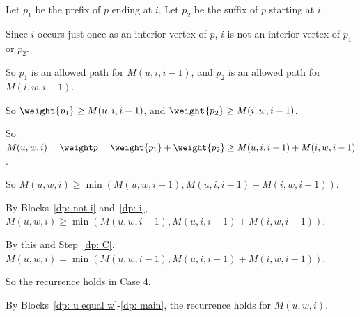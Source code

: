 \begin{longFormProof}
\begin{block}[dp: uwi]
\begin{block}[dp: main]
\begin{block}[dp: i]
        \step Let $p_1$ be the prefix of $p$ ending at $i$.
        Let $p_2$ be the suffix of $p$ starting at $i$.

        \step Since $i$ occurs just once as an interior vertex of $p$,
        $i$ is not an interior vertex of $p_1$ or $p_2$.

        \step So $p_1$ is an allowed path for $M(u, i, i-1)$,
        and $p_2$ is an allowed path for $M(i, w, i-1)$.

        \step So $\weight {p_1} \ge M(u, i, i-1)$,
        and  $\weight {p_2} \ge M(i, w, i-1)$.

        \step So $M(u, w, i) = \weight p = \weight {p_1} + \weight {p_2}
        \ge M(u, i, i-1) + M(i, w, i-1)$.

        \step So  $M(u, w, i) \ge \min( M(u, w, i-1), M(u, i, i-1) + M(i, w, i-1) )$. 
      \end{block}          

      \step By Blocks~\ref{dp: not i} and~\ref{dp: i},
      $M(u, w, i) \ge \min( M(u, w, i-1), M(u, i, i-1) + M(i, w, i-1) )$. 

      \step By this and Step~\ref{dp: C},
      $M(u, w, i) = \min( M(u, w, i-1), M(u, i, i-1) + M(i, w, i-1) )$.

      \step So the recurrence holds in Case 4.
    \end{block}
    \step By Blocks~\ref{dp: u equal w}-\ref{dp: main},
    the recurrence holds for $M(u,w,i)$.
  \end{block}
\end{longFormProof}    


